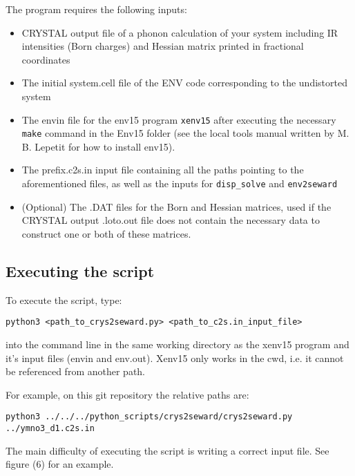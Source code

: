 The program requires the following inputs:

\begin{itemize}
	
	\item CRYSTAL output file of a phonon calculation of your system including IR intensities (Born charges) and Hessian matrix printed in fractional coordinates
	\item The initial system.cell file of the ENV code corresponding to the undistorted system
	\item The envin file for the env15 program \texttt{xenv15} after executing the necessary \texttt{make} command in the Env15 folder (see the local tools manual written by M. B. Lepetit for how to install env15).
	\item The prefix.c2s.in input file containing all the paths pointing to the aforementioned files, as well as the inputs for \texttt{disp\_solve} and \texttt{env2seward}
	
	\item (Optional) The .DAT files for the Born and Hessian matrices, used if the CRYSTAL output .loto.out file does not contain the necessary data to construct one or both of these matrices.
\end{itemize}


\subsection{Executing the script}

To execute the script, type:

\texttt{python3 <path\_to\_crys2seward.py> <path\_to\_c2s.in\_input\_file>}

into the command line in the same working directory as the xenv15 program and it's input files (envin and env.out).
Xenv15 only works in the cwd, i.e. it cannot be referenced from another path.

For example, on this git repository the relative paths are:

\texttt{python3 ../../../python\_scripts/crys2seward/crys2seward.py ../ymno3\_d1.c2s.in}

The main difficulty of executing the script is writing a correct input file. See figure (6) for an example.


